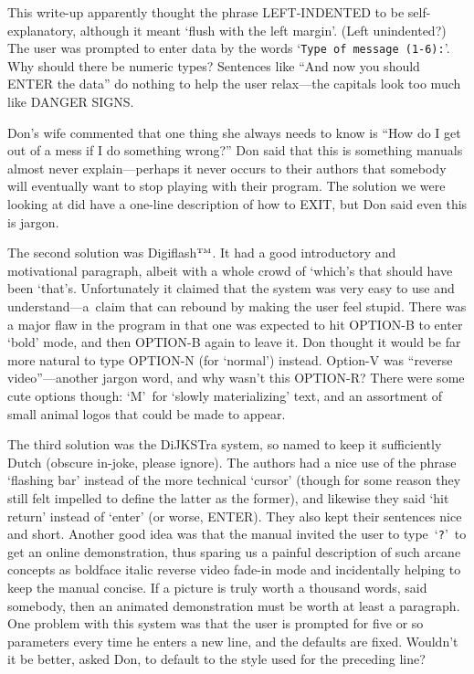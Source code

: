 This write-up apparently thought the phrase LEFT-INDENTED to be
self-explanatory, although it meant `flush with the left margin'.
(Left unindented?)
The user was prompted to enter data by the words
`{\tt Type of message (1-6):}'.
Why should there be numeric types? Sentences like ``And now you
should ENTER the data'' do nothing to help the user relax---the capitals
look too much like DANGER SIGNS.

Don's wife commented that one thing she always needs to know is
``How do I get out of a mess if I do something wrong?'' Don said that
this is something manuals almost never explain---perhaps it never
occurs to their authors that somebody will eventually want to stop
playing with their program. The solution we were looking at did have
a one-line description of how to EXIT, but Don said
even this is jargon.

The second solution was Digiflash$^{\scriptscriptstyle\rm TM}$. It had a
good introductory and motivational paragraph, albeit with a whole crowd
of `which's that should have been `that's. Unfortunately it claimed
that the system was very easy to use and understand---a~claim that can
rebound by making the user feel stupid. There was a major flaw in the
program in that one was expected to hit OPTION-B to enter `bold' mode,
and then OPTION-B again to leave it. Don thought it would be far more
natural to type OPTION-N (for `normal') instead. Option-V was
``reverse video''---another jargon word, and why wasn't this
OPTION-R? There were some cute options though: `M'~for `slowly materializing'
text, and an assortment of small animal logos that could be made to appear.

The third solution was the DiJKSTra system, so named to keep it
sufficiently Dutch (obscure in-joke, please ignore). The authors had
a nice use of the phrase `flashing bar' instead of the more technical
`cursor' (though for some reason they still felt impelled to define
the latter as the former), and likewise they said `hit return' instead
of `enter' (or worse, ENTER). They also kept their sentences nice and
short. Another good idea was that the manual invited the user
to type~`{\tt ?}'\ to get an online demonstration, thus sparing us a painful
description of such arcane concepts as boldface italic reverse video
fade-in mode and incidentally helping to keep the manual concise. If a
picture is truly worth a thousand words, said somebody, then an animated
demonstration must be worth at least a paragraph. One problem with this
system was that the user is prompted for five or so parameters every time
he enters a new line, and the defaults are fixed. Wouldn't it be better,
asked Don, to default to the style used for the preceding line?

